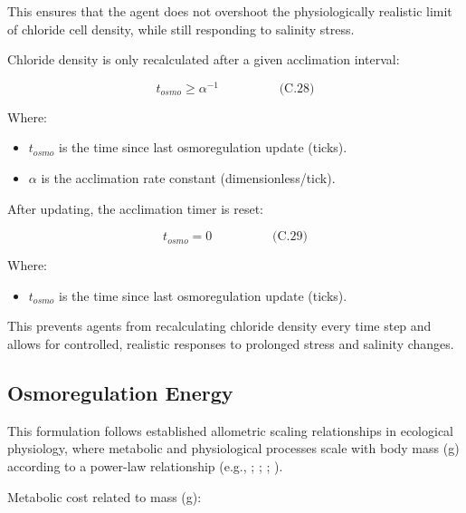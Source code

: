 \documentclass[
]{book}
\providecommand{\tightlist}{%
  \setlength{\itemsep}{0pt}\setlength{\parskip}{0pt}}
\begin{document}
This ensures that the agent does not overshoot the physiologically
realistic limit of chloride cell density, while still responding to
salinity stress.

Chloride density is only recalculated after a given acclimation
interval:

\[
\begin{equation} t_{osmo} \geq \alpha^{-1}  \hspace{2cm} \text{(C.28)} \end{equation}
\]

Where:

\begin{itemize}
\tightlist
\item
  \(t_{osmo}\) is the time since last osmoregulation update (ticks).
\item
  \(\alpha\) is the acclimation rate constant (dimensionless/tick).
\end{itemize}

After updating, the acclimation timer is reset:

\[
\begin{equation} t_{osmo} = 0  \hspace{2cm} \text{(C.29)} \end{equation}
\]

Where:

\begin{itemize}
\tightlist
\item
  \(t_{osmo}\) is the time since last osmoregulation update (ticks).
\end{itemize}

This prevents agents from recalculating chloride density every time step
and allows for controlled, realistic responses to prolonged stress and
salinity changes.

\subsection*{Osmoregulation Energy}\label{osmoregulation-energy}

This formulation follows established allometric scaling relationships in
ecological physiology, where metabolic and physiological processes scale
with body mass (g) according to a power-law relationship (e.g.,
\citet{kleiber_body_1932}; \citet{west_general_1997}; \citet{brown_toward_2004};
\citet{schmidt_nielsen_animal_1997}).

Metabolic cost related to mass (g):
\end{document}
